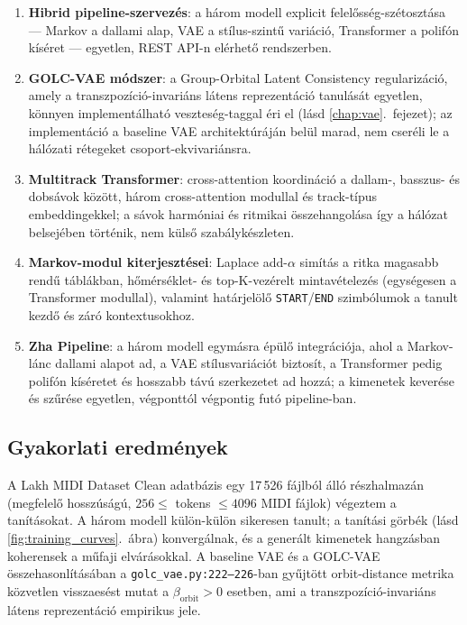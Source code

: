 \begin{enumerate}
  \item \textbf{Hibrid pipeline-szervezés}: a három modell explicit felelősség-szétosztása --- Markov a dallami alap, VAE a stílus-szintű variáció, Transformer a polifón kíséret --- egyetlen, REST API-n elérhető rendszerben.

  \item \textbf{GOLC-VAE módszer}: a Group-Orbital Latent Consistency regularizáció, amely a transzpozíció-invariáns látens reprezentáció tanulását egyetlen, könnyen implementálható veszteség-taggal éri el (lásd \ref{chap:vae}.\ fejezet); az implementáció a baseline VAE architektúráján belül marad, nem cseréli le a hálózati rétegeket csoport-ekvivariánsra.

  \item \textbf{Multitrack Transformer}: cross-attention koordináció a dallam-, basszus- és dobsávok között, három cross-attention modullal és track-típus embeddingekkel; a sávok harmóniai és ritmikai összehangolása így a hálózat belsejében történik, nem külső szabálykészleten.

  \item \textbf{Markov-modul kiterjesztései}: Laplace add-$\alpha$ simítás a ritka magasabb rendű táblákban, hőmérséklet- és top-K-vezérelt mintavételezés (egységesen a Transformer modullal), valamint határjelölő \texttt{START}/\texttt{END} szimbólumok a tanult kezdő és záró kontextusokhoz.

  \item \textbf{Zha Pipeline}: a három modell egymásra épülő integrációja, ahol a Markov-lánc dallami alapot ad, a VAE stílusvariációt biztosít, a Transformer pedig polifón kíséretet és hosszabb távú szerkezetet ad hozzá; a kimenetek keverése és szűrése egyetlen, végponttól végpontig futó pipeline-ban.
\end{enumerate}

\subsection{Gyakorlati eredmények}

A Lakh MIDI Dataset Clean adatbázis egy 17\,526 fájlból álló részhalmazán (megfelelő hosszúságú, $256 \leq$ tokens $\leq 4096$ MIDI fájlok) végeztem a tanításokat. A három modell külön-külön sikeresen tanult; a tanítási görbék (lásd \ref{fig:training_curves}.\ ábra) konvergálnak, és a generált kimenetek hangzásban koherensek a műfaji elvárásokkal. A baseline VAE és a GOLC-VAE összehasonlításában a \texttt{golc\_vae.py:222--226}-ban gyűjtött orbit-distance metrika közvetlen visszaesést mutat a $\beta_{\text{orbit}} > 0$ esetben, ami a transzpozíció-invariáns látens reprezentáció empirikus jele.

